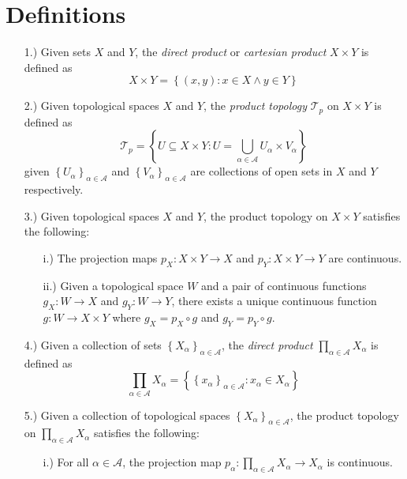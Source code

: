 \documentclass[12pt]{article}
\newcommand{\braces}[1]{\left\{#1\right\}}           %
\begin{document}
\pagestyle{fancy}
\fancyhead{}

\normalsize

\section*{Definitions}
\begin{itemize}
    \item [1.)] Given sets $X$ and $Y$, the \textit{direct product} or \textit{cartesian product} $X\times Y$ is defined as
    \[X\times Y=\braces{(x,y):x\in X\land y\in Y}\]

    \item [2.)] Given topological spaces $X$ and $Y$, the \textit{product topology} $\mathcal{T}_p$ on $X\times Y$ is defined as
    \[\mathcal{T}_p=\braces{U\subseteq X\times Y:U=\bigcup_{\alpha\in\mathcal{A}}U_\alpha\times V_\alpha}\]
    given $\braces{U_\alpha}_{\alpha\in\mathcal{A}}$ and $\braces{V_\alpha}_{\alpha\in\mathcal{A}}$ are collections of open sets in $X$ and $Y$ respectively.

    \item [3.)] Given topological spaces $X$ and $Y$, the product topology on $X\times Y$ satisfies the following:
    \begin{itemize}
        \item [i.)] The projection maps $p_X:X\times Y\to X$ and $p_Y:X\times Y\to Y$ are continuous.

        \item [ii.)] Given a topological space $W$ and a pair of continuous functions $g_X:W\to X$ and $g_Y:W\to Y$, there exists a unique continuous function $g:W\to X\times Y$ where $g_X=p_X\circ g$ and $g_Y=p_Y\circ g$.
    \end{itemize}

    \item [4.)] Given a collection of sets $\braces{X_\alpha}_{\alpha\in\mathcal{A}}$, the \textit{direct product} $\displaystyle\prod_{\alpha\in\mathcal{A}}X_\alpha$ is defined as
    \[\prod_{\alpha\in\mathcal{A}}X_\alpha=\braces{\braces{x_\alpha}_{\alpha\in\mathcal{A}}:x_\alpha\in X_\alpha}\]

    \item [5.)] Given a collection of topological spaces $\braces{X_\alpha}_{\alpha\in\mathcal{A}}$, the product topology on $\displaystyle\prod_{\alpha\in\mathcal{A}}X_\alpha$ satisfies the following:
    \begin{itemize}
        \item [i.)] For all $\alpha\in\mathcal{A}$, the projection map $p_\alpha:\prod_{\alpha\in\mathcal{A}}X_\alpha\to X_\alpha$ is continuous.


\end{itemize}
\end{itemize}
\end{document}
